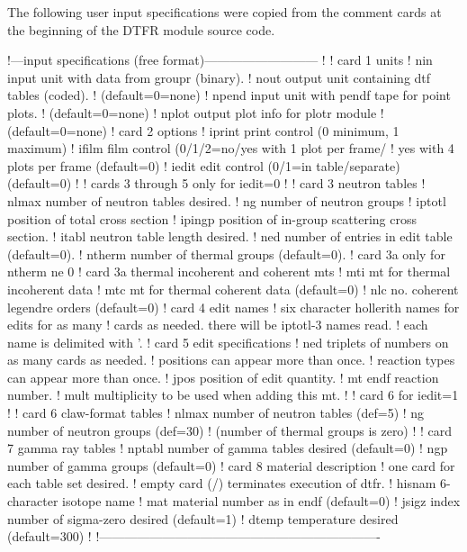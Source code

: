 The following user input specifications were copied from the
comment cards at the beginning of the DTFR module source code.

\small
\begin{ccode}

   !---input specifications (free format)---------------------------
   !
   ! card 1       units
   !    nin       input unit with data from groupr (binary).
   !    nout      output unit containing dtf tables (coded).
   !              (default=0=none)
   !    npend     input unit with pendf tape for point plots.
   !              (default=0=none)
   !    nplot     output plot info for plotr module
   !              (default=0=none)
   ! card 2       options
   !    iprint    print control (0 minimum, 1 maximum)
   !    ifilm     film control (0/1/2=no/yes with 1 plot per frame/
   !              yes with 4 plots per frame (default=0)
   !    iedit     edit control (0/1=in table/separate) (default=0)
   !
   !       cards 3 through 5 only for iedit=0
   !
   ! card 3       neutron tables
   !    nlmax     number of neutron tables desired.
   !    ng        number of neutron groups
   !    iptotl    position of total cross section
   !    ipingp    position of in-group scattering cross section.
   !    itabl     neutron table length desired.
   !    ned       number of entries in edit table (default=0).
   !    ntherm    number of thermal groups (default=0).
   !  card 3a only for ntherm ne 0
   ! card 3a      thermal incoherent and coherent mts
   !    mti       mt for thermal incoherent data
   !    mtc       mt for thermal coherent data (default=0)
   !    nlc       no. coherent legendre orders (default=0)
   ! card 4       edit names
   !       six character hollerith names for edits for as many
   !       cards as needed.  there will be iptotl-3 names read.
   !       each name is delimited with '.
   ! card 5       edit specifications
   !       ned triplets of numbers on as many cards as needed.
   !       positions can appear more than once.
   !       reaction types can appear more than once.
   !    jpos      position of edit quantity.
   !    mt        endf reaction number.
   !    mult      multiplicity to be used when adding this mt.
   !
   !       card 6 for iedit=1
   !
   ! card 6       claw-format tables
   !    nlmax     number of neutron tables (def=5)
   !    ng        number of neutron groups (def=30)
   !              (number of thermal groups is zero)
   !
   ! card 7       gamma ray tables
   !    nptabl    number of gamma tables desired (default=0)
   !    ngp       number of gamma groups (default=0)
   ! card 8       material description
   !       one card for each table set desired.
   !       empty card (/) terminates execution of dtfr.
   !    hisnam    6-character isotope name
   !    mat       material number as in endf (default=0)
   !    jsigz     index number of sigma-zero desired (default=1)
   !    dtemp     temperature desired (default=300)
   !
   !-------------------------------------------------------------------

\end{ccode}
\normalsize

